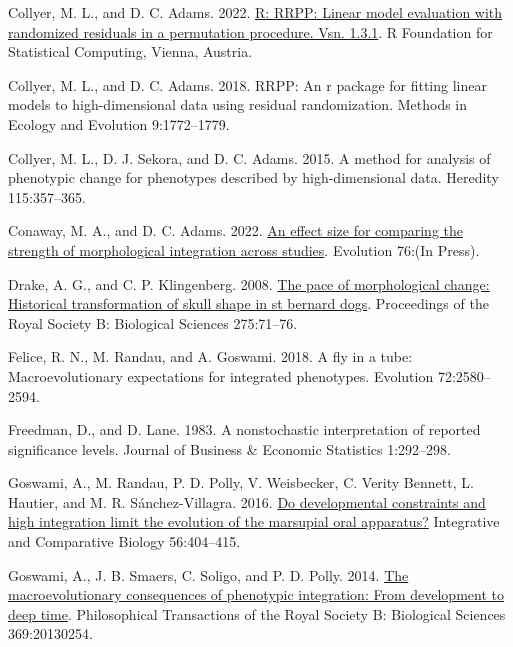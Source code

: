 \documentclass[
  11pt,
]{article}
\newlength{\cslhangindent}
\newlength{\cslentryspacingunit} %
\newenvironment{CSLReferences}[2] %
 {%
  \setlength{\parindent}{0pt}
  \ifodd #1
  \let\oldpar\par
  \def\par{\hangindent=\cslhangindent\oldpar}
  \fi
  \setlength{\parskip}{#2\cslentryspacingunit}
 }%
 {}
\begin{document}
\begin{CSLReferences}{1}{0}
\leavevmode{}%
Collyer, M. L., and D. C. Adams. 2022.
\href{https://CRAN.R-project.org/package=RRPP}{R: RRPP: Linear model
evaluation with randomized residuals in a permutation procedure. Vsn.
1.3.1}. R Foundation for Statistical Computing, Vienna, Austria.

\leavevmode{}%
Collyer, M. L., and D. C. Adams. 2018. RRPP: An r package for fitting
linear models to high-dimensional data using residual randomization.
Methods in Ecology and Evolution 9:1772--1779.

\leavevmode{}%
Collyer, M. L., D. J. Sekora, and D. C. Adams. 2015. A method for
analysis of phenotypic change for phenotypes described by
high-dimensional data. Heredity 115:357--365.

\leavevmode{}%
Conaway, M. A., and D. C. Adams. 2022.
\href{https://doi.org/10.1111/evo.14595}{An effect size for comparing
the strength of morphological integration across studies}. Evolution
76:(In Press).

\leavevmode{}%
Drake, A. G., and C. P. Klingenberg. 2008.
\href{https://doi.org/10.1098/rspb.2007.1169}{The pace of morphological
change: Historical transformation of skull shape in st bernard dogs}.
Proceedings of the Royal Society B: Biological Sciences 275:71--76.

\leavevmode{}%
Felice, R. N., M. Randau, and A. Goswami. 2018. A fly in a tube:
Macroevolutionary expectations for integrated phenotypes. Evolution
72:2580--2594.

\leavevmode{}%
Freedman, D., and D. Lane. 1983. A nonstochastic interpretation of
reported significance levels. Journal of Business {\&} Economic
Statistics 1:292--298.

\leavevmode{}%
Goswami, A., M. Randau, P. D. Polly, V. Weisbecker, C. Verity Bennett,
L. Hautier, and M. R. Sánchez-Villagra. 2016.
\href{https://doi.org/10.1093/icb/icw039}{Do developmental constraints
and high integration limit the evolution of the marsupial oral
apparatus?} Integrative and Comparative Biology 56:404--415.

\leavevmode{}%
Goswami, A., J. B. Smaers, C. Soligo, and P. D. Polly. 2014.
\href{https://doi.org/10.1098/rstb.2013.0254}{The macroevolutionary
consequences of phenotypic integration: From development to deep time}.
Philosophical Transactions of the Royal Society B: Biological Sciences
369:20130254.


\end{CSLReferences}
\end{document}
